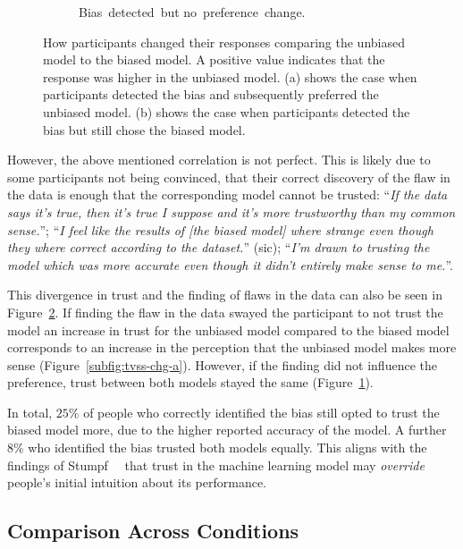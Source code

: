 \begin{figure}
\begin{subfigure}{0.45\linewidth}
\caption{\centering Bias~detected~but no~preference~change.}
\label{subfig:tvss-chg-b}
\end{subfigure}%
\caption[Change in trust and whether the model makes sense.]{
How participants changed their responses comparing the unbiased model to the biased model.
A positive value indicates that the response was higher in the unbiased model.
(a) shows the case when participants detected the bias and subsequently preferred the unbiased model.
(b) shows the case when participants detected the bias but still chose the biased model.
}
\label{figs:tvss-chg}
\end{figure}

However, the above mentioned correlation is not perfect.
This is likely due to some participants not being convinced, that their correct discovery of the flaw in the data is enough that the corresponding model cannot be trusted:
``\emph{If the data says it's true, then it's true I suppose and it's more trustworthy than my common sense.}'';
``\emph{I feel like the results of [the biased model] where strange even though they where correct according to the dataset.}'' (sic);
``\emph{I'm drawn to trusting the model which was more accurate even though it didn't entirely make sense to me.}''.

This divergence in trust and the finding of flaws in the data can also be seen in Figure~\ref{figs:tvss-chg}.
If finding the flaw in the data swayed the participant to not trust the model an increase in trust for the unbiased model compared to the biased model corresponds to an increase in the perception that the unbiased model makes more sense (Figure~\ref{subfig:tvss-chg-a}).
However, if the finding did not influence the preference, trust between both models stayed the same (Figure~\ref{subfig:tvss-chg-b}).

In total, $25\%$ of people who correctly identified the bias still opted to trust the biased model more, due to the higher reported accuracy of the model.
A further $8\%$ who identified the bias trusted both models equally.
This aligns with the findings of Stumpf~\etal~\cite{harmful} that trust in the machine learning model may \emph{override} people's initial intuition about its performance.

\subsection{Comparison Across Conditions}

